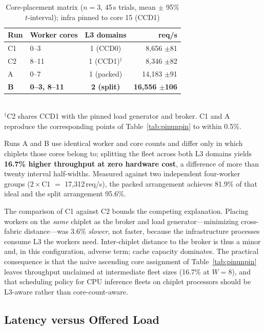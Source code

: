 \documentclass[conference]{IEEEtran}
\begin{document}
\begin{table}[t]
\caption{Core-placement matrix ($n{=}3$, 45\,s trials, mean $\pm$ 95\% $t$-interval); infra pinned to core 15 (CCD1)}
\label{tab:placement}
\centering\small\setlength{\tabcolsep}{4pt}
\begin{tabular}{@{}llcr@{}}
\toprule
Run & Worker cores & L3 domains & req/s \\
\midrule
C1 & 0--3          & 1 (CCD0) & 8{,}656 $\pm$81 \\
C2 & 8--11         & 1 (CCD1)$^{\dagger}$ & 8{,}346 $\pm$82 \\
A  & 0--7          & 1 (packed) & 14{,}183 $\pm$91 \\
\textbf{B} & \textbf{0--3, 8--11} & \textbf{2 (split)} & \textbf{16{,}556 $\pm$106} \\
\bottomrule
\end{tabular}
\\[2pt]\footnotesize $^{\dagger}$C2 shares CCD1 with the pinned load generator and
broker. C1 and A reproduce the corresponding points of Table~\ref{tab:pinunpin}
to within 0.5\%.
\end{table}

Runs A and B use identical worker and core counts and differ only in which chiplets those cores belong to; splitting the fleet across both L3 domains yields \textbf{16.7\% higher throughput at zero hardware cost}, a difference of more than twenty interval half-widths. Measured against two independent four-worker groups ($2\times$C1 $=$ 17{,}312\,req/s), the packed arrangement achieves 81.9\% of that ideal and the split arrangement 95.6\%.

The comparison of C1 against C2 bounds the competing explanation. Placing workers on the \emph{same} chiplet as the broker and load generator---minimizing cross-fabric distance---was 3.6\% \emph{slower}, not faster, because the infrastructure processes consume L3 the workers need. Inter-chiplet distance to the broker is thus a minor and, in this configuration, adverse term; cache capacity dominates. The practical consequence is that the naive ascending core assignment of Table~\ref{tab:pinunpin} leaves throughput unclaimed at intermediate fleet sizes (16.7\% at $W{=}8$), and that scheduling policy for CPU inference fleets on chiplet processors should be L3-aware rather than core-count-aware.

\subsection{Latency versus Offered Load}
\label{sec:latency}
\end{document}
